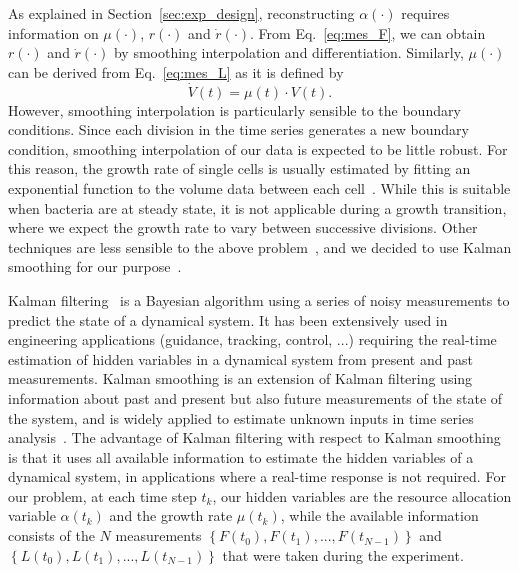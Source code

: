 As explained in Section~\ref{sec:exp_design}, reconstructing $\alpha (\cdot)$ requires information on $\mu (\cdot)$, $r(\cdot)$ and $\dot{r}(\cdot)$.
From Eq.~\ref{eq:mes_F}, we can obtain $r(\cdot)$ and $\dot{r}(\cdot)$ by smoothing interpolation and differentiation.
Similarly, $\mu (\cdot)$ can be derived from Eq.~\ref{eq:mes_L} as it is defined by
\[
\dot{V}(t) = \mu (t) \cdot V(t).
\]
However, smoothing interpolation is particularly sensible to the boundary conditions.
Since each division in the time series generates a new boundary condition, smoothing interpolation of our data is expected to be little robust.
For this reason, the growth rate of single cells is usually estimated by fitting an exponential function to the volume data between each cell~\cite{wang_robust_2010,izard_synthetic_2015}.
While this is suitable when bacteria are at steady state, it is not applicable during a growth transition, where we expect the growth rate to vary between successive divisions.
Other techniques are less sensible to the above problem~\cite{zulkower_robust_2015}, and we decided to use Kalman smoothing for our purpose~\cite{kailath_linear_2000,jazwinski_stochastic_2007}.

Kalman filtering~\cite{kalman_new_1960} is a Bayesian algorithm using a series of noisy measurements to predict the state of a dynamical system.
It has been extensively used in engineering applications (guidance, tracking, control, ...) requiring the real-time estimation of hidden variables in a dynamical system from present and past measurements.
Kalman smoothing is an extension of Kalman filtering using information about past and present but also future measurements of the state of the system, and is widely applied to estimate unknown inputs in time series analysis~\cite{kailath_linear_2000,jazwinski_stochastic_2007}.
The advantage of Kalman filtering with respect to Kalman smoothing is that it uses all available information to estimate the hidden variables of a dynamical system, in applications where a real-time response is not required.
For our problem, at each time step $t_k$, our hidden variables are the resource allocation variable $\alpha (t_k)$ and the growth rate $\mu (t_k)$, while the available information consists of the $N$ measurements $\left\{ F(t_0), F(t_1), ..., F(t_{N-1}) \right\}$ and $\left\{L(t_0), L(t_1), ..., L(t_{N-1}) \right\}$ that were taken during the experiment.

